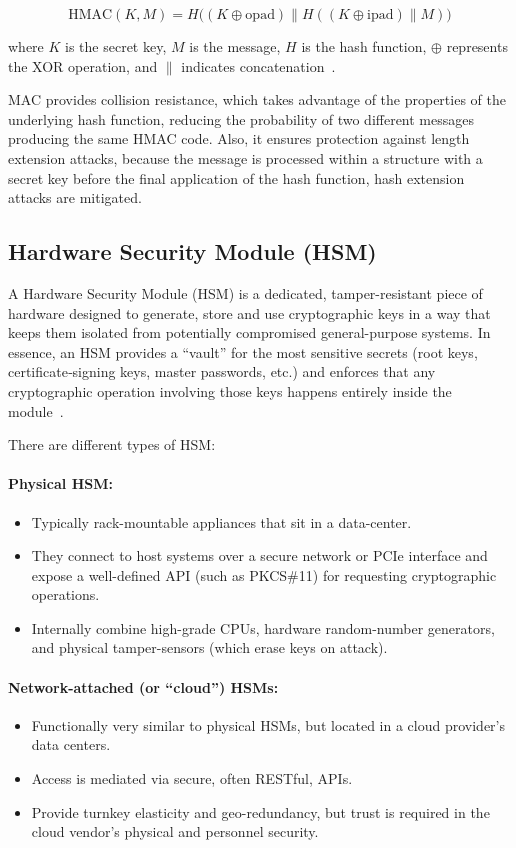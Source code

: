 \[
\text{HMAC}(K,M) = H\big((K \oplus \text{opad}) \parallel H((K \oplus \text{ipad}) \parallel M)\big)
\]

where $K$ is the secret key, $M$ is the message, $H$ is the hash function, $\oplus$ represents the XOR operation, and $\parallel$ indicates concatenation~\cite{Ref21}.

MAC provides collision resistance, which takes advantage of the properties of the
underlying hash function, reducing the probability of two different messages
producing the same HMAC code. Also, it ensures protection against length extension
attacks, because the message is processed within a structure with a secret key
before the final application of the hash function, hash extension attacks are
mitigated.


\subsection{Hardware Security Module (HSM)}
\label{subsec:hsm}

A Hardware Security Module (HSM) is a dedicated, tamper-resistant piece of
hardware designed to generate, store and use cryptographic keys in a way that
keeps them isolated from potentially compromised general-purpose systems. In
essence, an HSM provides a “vault” for the most sensitive secrets (root keys,
certificate‐signing keys, master passwords, etc.) and enforces that any
cryptographic operation involving those keys happens entirely inside the module~\cite{Ref22}.

There are different types of HSM:

\paragraph{Physical HSM:}
\begin{itemize}
	\item Typically rack-mountable appliances that sit in a data-center.
	\item They connect to host systems over a secure network or PCIe interface and expose a well-defined API (such as PKCS\#11) for requesting cryptographic operations.
	\item Internally combine high-grade CPUs, hardware random-number generators, and physical tamper-sensors (which erase keys on attack).
\end{itemize}

\paragraph{Network-attached (or “cloud”) HSMs:}
\begin{itemize}
	\item Functionally very similar to physical HSMs, but located in a cloud provider’s data centers.
	\item Access is mediated via secure, often RESTful, APIs.
	\item Provide turnkey elasticity and geo-redundancy, but trust is required in the cloud vendor’s physical and personnel security.
\end{itemize}

